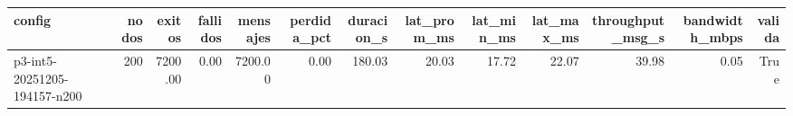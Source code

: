 \begin{tabular}{lrrrrrrrrrrrr}
\toprule
config & nodos & exitos & fallidos & mensajes & perdida_pct & duracion_s & lat_prom_ms & lat_min_ms & lat_max_ms & throughput_msg_s & bandwidth_mbps & valida \\
\midrule
p3-int5-20251205-194157-n200 & 200 & 7200.00 & 0.00 & 7200.00 & 0.00 & 180.03 & 20.03 & 17.72 & 22.07 & 39.98 & 0.05 & True \\
\bottomrule
\end{tabular}
